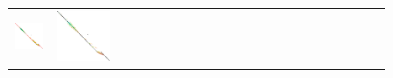 \begin{figure}[t]
\begin{tabular}{l>{\centering}m{0.18\linewidth}>{\centering}m{0.18\linewidth}>{\centering}m{0.18\linewidth}>{\centering\arraybackslash}m{0.35\linewidth}}
    \includegraphics[scale=0.15]{imgs/comparison/gcsh.png} &
    \includegraphics[scale=0.15]{imgs/comparison/gcsh-noprune-dt.png} &

\end{tabular}
\end{figure}
